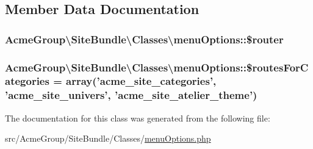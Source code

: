 \subsection{Member Data Documentation}
\hypertarget{class_acme_group_1_1_site_bundle_1_1_classes_1_1menu_options_a813d60ba241236808bc5610ad7ec9803}{
\subsubsection[{\$router}]{\setlength{\rightskip}{0pt plus 5cm}Acme\+Group\textbackslash{}\+Site\+Bundle\textbackslash{}\+Classes\textbackslash{}menu\+Options\+::\$router\hspace{0.3cm}{\ttfamily [protected]}}}\label{class_acme_group_1_1_site_bundle_1_1_classes_1_1menu_options_a813d60ba241236808bc5610ad7ec9803}
\hypertarget{class_acme_group_1_1_site_bundle_1_1_classes_1_1menu_options_ad4183f357d70f8ef3b000340d84c7082}{
\subsubsection[{\$routes\+For\+Categories}]{\setlength{\rightskip}{0pt plus 5cm}Acme\+Group\textbackslash{}\+Site\+Bundle\textbackslash{}\+Classes\textbackslash{}menu\+Options\+::\$routes\+For\+Categories = array('acme\+\_\+site\+\_\+categories', 'acme\+\_\+site\+\_\+univers', 'acme\+\_\+site\+\_\+atelier\+\_\+theme')\hspace{0.3cm}{\ttfamily [protected]}}}\label{class_acme_group_1_1_site_bundle_1_1_classes_1_1menu_options_ad4183f357d70f8ef3b000340d84c7082}


The documentation for this class was generated from the following file\+:\begin{DoxyCompactItemize}
\item 
src/\+Acme\+Group/\+Site\+Bundle/\+Classes/\hyperlink{menu_options_8php}{menu\+Options.\+php}\end{DoxyCompactItemize}
